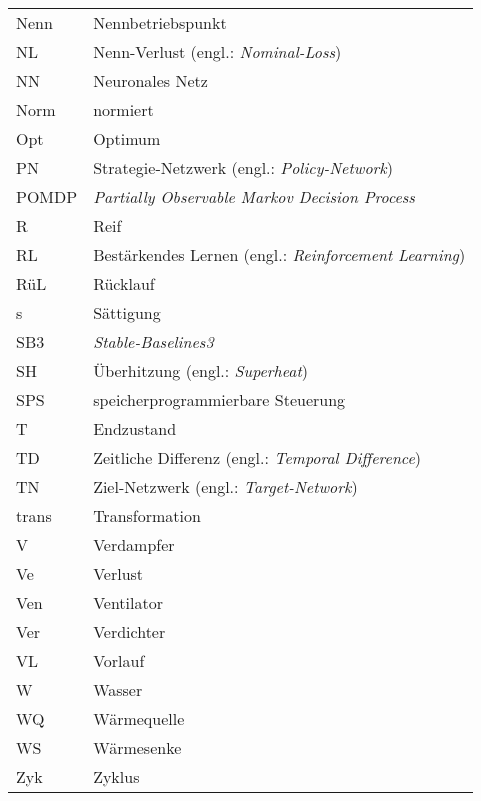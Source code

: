 \begin{onehalfspacing}
\begin{longtable}[h]{p{} p{}}
		Nenn & Nennbetriebspunkt\\
		NL & Nenn-Verlust (engl.: \textit{Nominal-Loss})\\
		NN & Neuronales Netz\\
		Norm& normiert\\
		Opt& Optimum\\
		PN& Strategie-Netzwerk (engl.: \textit{Policy-Network})\\
		POMDP& \textit{Partially Observable Markov Decision Process}\\
		R& Reif\\
		RL& Bestärkendes Lernen (engl.: \textit{Reinforcement Learning})\\
		RüL& Rücklauf\\
		s & Sättigung\\
		SB3 & \textit{Stable-Baselines3}\\
		SH& Überhitzung (engl.: \textit{Superheat})\\
		SPS& speicherprogrammierbare Steuerung\\
		T & Endzustand\\
		TD& Zeitliche Differenz (engl.: \textit{Temporal Difference})\\
		TN & Ziel-Netzwerk (engl.: \textit{Target-Network})\\
		trans & Transformation\\
		V & Verdampfer\\
		Ve& Verlust\\
		Ven&Ventilator\\
		Ver& Verdichter\\	
		VL& Vorlauf\\
		W & Wasser\\
		WQ & Wärmequelle\\
		WS & Wärmesenke\\
		Zyk&Zyklus\\

\end{longtable}
\end{onehalfspacing}
